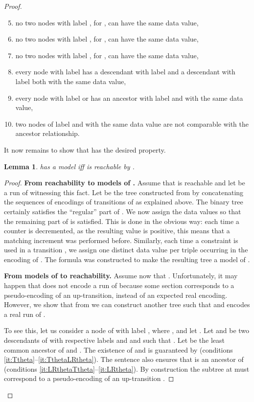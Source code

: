 \documentclass{CSML}
\newtheorem{lemma}[theorem]{Lemma}
\begin{document}
\begin{proof}
\begin{enumerate}[label=\enspace(\arabic*)]
\setcounter{enumi}{4}
\item \label{it:Ttheta} no two nodes with label , for ,
      can have the same data value,
\item \label{it:Ltheta} no two nodes with label , for , 
       can have the same data value,
\item \label{it:Rtheta} no two nodes with label , for , 
       can have the same data value,
\item \label{it:TthetaLRtheta} every node with label  has a descendant with label  
      and a descendant with label 
      both with the same data value,
\item \label{it:LRthetaTtheta} every node with label  or  has an ancestor with label  
      and with the same data value,
\item \label{it:LRtheta} two nodes of label  and  with the same data value
  are not comparable with the ancestor relationship.
\end{enumerate}
It now remains to show that  has the desired property.
\begin{lemma}\label{lemma-ebvass-fo}
 has a model iff  is reachable by .
\end{lemma}
\begin{proof}
{\bf From reachability to models of .}
Assume that  is reachable and let  be a run of  witnessing this fact.
Let  be the tree constructed from  by concatenating the sequences
of encodings of transitions of  as explained above. 
The binary tree  certainly satisfies the ``regular'' part of . 
We now assign the data values so that
the remaining part of  is satisfied. This is done in the obvious way:
each time a counter  is decremented, as the resulting value is positive,
this means that a matching increment was performed before. Similarly, each time
a constraint  is used in a transition , we assign one distinct
data value per triple  
occurring in the encoding of
. The formula was constructed to make the resulting tree a model of .

{\bf From models of  to reachability.}
Assume now that . 
Unfortunately, it may happen that  does not encode a run of  because some section corresponds to a pseudo-encoding of an up-transition, 
instead of an expected real encoding. 
However, we show that from  we can construct another tree
 such that  
and  encodes a real run of .

To see this, let us consider a node  of  
with label , 
where , and let . 
Let  and  be two descendants of  
with respective labels  and 
and such that . 
Let  be the least common ancestor of  and .
The existence of  and  is guaranteed by  
(conditions \ref{it:Ttheta}--\ref{it:TthetaLRtheta}). The sentence  also ensures
that  is an ancestor of  
(conditions \ref{it:LRthetaTtheta}--\ref{it:LRtheta}).  By construction the subtree at  must correspond to
a pseudo-encoding of an up-transition .


\end{proof}
\end{proof}
\end{document}

